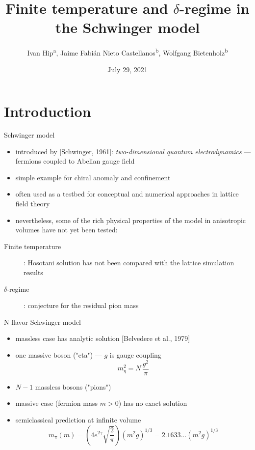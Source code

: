 \documentclass[english]{beamer}
\title{Finite temperature and $\delta$-regime in the Schwinger model}
\author{
  Ivan Hip\textsuperscript{a},
  Jaime Fabián Nieto Castellanos\textsuperscript{b},
  Wolfgang Bietenholz\textsuperscript{b}}
\institute{
  \textsuperscript{a}University of Zagreb, Croatia\\
  \textsuperscript{b}UNAM, Mexico
}
\date{July 29, 2021}
\begin{document}
 
\begin{frame}
  \titlepage
\end{frame}


\section{Introduction}

\begin{frame}{Schwinger model}
  \begin{itemize}
    \item introduced by [Schwinger, 1961]:
      \textit{two-dimensional quantum electrodynamics}
      --- fermions coupled to Abelian gauge field 
    \item simple example for chiral anomaly and confinement
    \item often used as a testbed for conceptual and numerical
approaches in lattice field theory
    \item nevertheless, some of the rich physical
properties of the model in anisotropic volumes have not yet been tested:
  \end{itemize}
  \begin{description}
    \item[Finite temperature]:
      Hosotani solution has not been compared with the lattice
      simulation results
    \item[$\delta$-regime]: conjecture for the residual pion mass
  \end{description}
\end{frame}

\begin{frame}{N-flavor Schwinger model}
  \begin{itemize}
    \item massless case has analytic solution
      [Belvedere et al., 1979]
    \item one massive boson ("eta") --- $g$ is gauge coupling
      \[
        m_\eta^2 = N\,\frac{g^2}{\pi}
      \]
    \item $N - 1$ massless bosons ("pions")
    \item massive case (fermion mass $m > 0$) has no exact solution
    \item semiclassical prediction at infinite volume
      \[
        m_\pi(m) = \left(4e^{2\gamma}\sqrt{\frac{2}{\pi}}\right)
          (m^2 g)^{1/3} = 2.1633...(m^2 g)^{1/3}
      \]        
  \end{itemize}
\end{frame}
\end{document}
